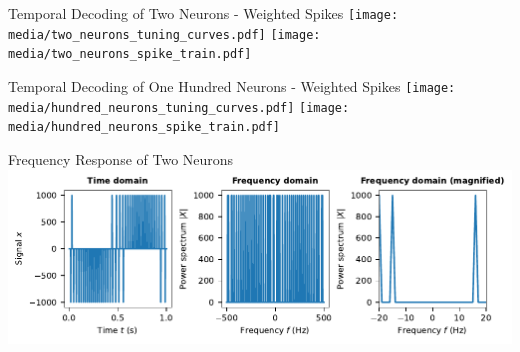 \documentclass[handout,aspectratio=169]{beamer}
\begin{document}
\begin{frame}{Temporal Decoding of Two Neurons - Weighted Spikes}
	\texttt{[image: media/two\_neurons\_tuning\_curves.pdf]}%
	\texttt{[image: media/two\_neurons\_spike\_train.pdf]}
\end{frame}

\begin{frame}{Temporal Decoding of One Hundred Neurons - Weighted Spikes}
	\texttt{[image: media/hundred\_neurons\_tuning\_curves.pdf]}%
	\texttt{[image: media/hundred\_neurons\_spike\_train.pdf]}
\end{frame}

\begin{frame}{Frequency Response of Two Neurons}
	\includegraphics[width=1\textwidth]{media/two_neurons_freq.pdf}%
\end{frame}
\end{document}
